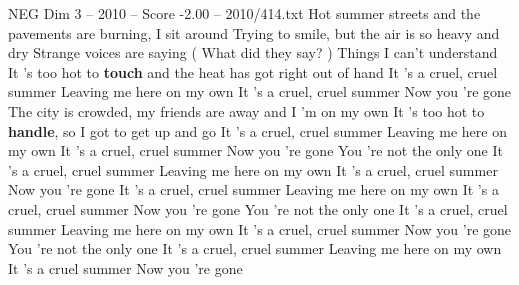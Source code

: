 \begin{textsample}{NEG Dim 3 – 2010 – Score -2.00 – 2010/414.txt}  \label{ex:f3_neg_025}
Hot summer streets and the pavements are burning, I sit around Trying to smile, but the air is so heavy and dry Strange voices are saying ( What did they say? ) Things I can't understand It 's too hot to \textbf{touch} and the heat has got right out of hand It 's a cruel, cruel summer Leaving me here on my own It 's a cruel, cruel summer Now you 're gone The city is crowded, my friends are away and I 'm on my own It 's too hot to \textbf{handle}, so I got to get up and go It 's a cruel, cruel summer Leaving me here on my own It 's a cruel, cruel summer Now you 're gone You 're not the only one It 's a cruel, cruel summer Leaving me here on my own It 's a cruel, cruel summer Now you 're gone It 's a cruel, cruel summer Leaving me here on my own It 's a cruel, cruel summer Now you 're gone You 're not the only one It 's a cruel, cruel summer Leaving me here on my own It 's a cruel, cruel summer Now you 're gone You 're not the only one It 's a cruel, cruel summer Leaving me here on my own It 's a cruel summer Now you 're gone

\end{textsample}
